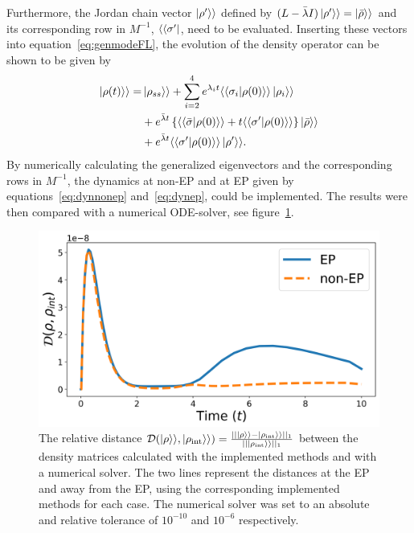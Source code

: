 \documentclass[../main.tex]{subfiles}
\begin{document}
Furthermore, the Jordan chain vector $\ket{\rho'}\rangle$ defined by $(L - \bar\lambda I)\ket{\rho'}\rangle = \ket{\bar\rho}\rangle$ and its corresponding row in $M^{-1}$, $\langle\bra{\sigma'}$, need to be evaluated. Inserting these vectors into equation~\eqref{eq:genmodeFL}, the evolution of the density operator can be shown to be given by
\begin{equation}\label{eq:dynep}
    \begin{aligned}
        \ket{\rho(t)}\rangle = &\ket{\rho_{ss}}\rangle + \sum_{i=2}^4 e^{\lambda_i t} \langle\braket{\sigma_i|\rho(0)}\rangle \ket{\rho_i}\rangle \\ 
                               & + e^{\bar \lambda t}\left\{\langle\braket{\bar\sigma|\rho(0)}\rangle + t\langle\braket{\sigma'|\rho(0)}\rangle \right\}\ket{\bar \rho}\rangle \\ 
                               & + e^{\bar\lambda t} \langle\braket{\sigma'|\rho(0)}\rangle\ket{\rho'}\rangle.
    \end{aligned}
\end{equation}
By numerically calculating the generalized eigenvectors and the corresponding rows in $M^{-1}$, the dynamics at non-EP and at EP given by equations~\eqref{eq:dynnonep} and~\eqref{eq:dynep}, could be implemented. The results were then compared with a numerical ODE-solver, see figure~\ref{fig:minevsint}.

\begin{figure}[H]
    \centering
    \includegraphics[width=0.7\linewidth]{figures/minevsint.png}
    \caption{The relative distance $\mathcal{D}(\ket{\rho}\rangle, \ket{\rho_\text{int}}\rangle) = \frac{||\ket{\rho}\rangle - \ket{\rho_\text{int}}\rangle||_1}{||\ket{\rho_\text{int}}\rangle||_1}$ between the density matrices calculated with the implemented methods and with a numerical solver. The two lines represent the distances at the EP and away from the EP, using the corresponding implemented methods for each case. The numerical solver was set to an absolute and relative tolerance of $10^{-10}$ and $10^{-6}$ respectively.}
    \label{fig:minevsint}
\end{figure}
\end{document}
